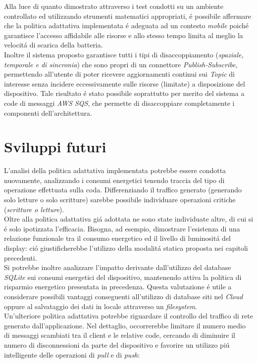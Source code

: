 \documentclass{article}
\begin{document}
Alla luce di quanto dimostrato attraverso i test condotti su un ambiente controllato ed utilizzando strumenti matematici appropriati, \'e possibile affermare che la politica adattativa implementata \'e adeguata ad un contesto \textit{mobile} poich\'e garantisce l'accesso affidabile alle risorse e allo stesso tempo limita al meglio la velocit\'a di scarica della batteria. 
\\
Inoltre il sistema proposto garantisce tutti i tipi di disaccoppiamento (\textit{spaziale, temporale e di sincronia}) che sono propri di un connettore \textit{Publish-Subscribe}, permettendo all'utente di poter ricevere aggiornamenti continui sui \textit{Topic} di interesse senza incidere eccessivamente sulle risorse (limitate) a disposizione del dispositivo. Tale risultato \'e stato possibile soprattutto per merito del sistema a code di messaggi \textit{AWS SQS}, che permette di disaccoppiare completamente i componenti dell'architettura. 

\section{Sviluppi futuri}

L'analisi della politica adattativa implementata potrebbe essere condotta nuovamente, analizzando i consumi energetici tenendo traccia del tipo di operazione effettuata sulla coda. Differenziando il traffico generato (generando solo letture o solo scritture) sarebbe possibile individuare operazioni critiche (\textit{scritture o letture}).
\\
Oltre alla politica adattativa gi\'a adottata ne sono state individuate altre, di cui si \'e solo ipotizzata l'efficacia. Bisogna, ad esempio, dimostrare l'esistenza di una relazione funzionale tra il consumo energetico ed il livello di luminosit\'a del display: ci\'o giustificherebbe l'utilizzo della modalit\'a statica proposta nei capitoli precedenti.
\\
Si potrebbe inoltre analizzare l'impatto derivante dall'utilizzo del database \textit{SQLite} sui consumi energetici del dispositivo, mantenendo attiva la politica di risparmio energetico presentata in precedenza. Questa valutazione \'e utile a considerare possibili vantaggi conseguenti all'utilizzo di database siti nel \textit{Cloud} oppure al salvataggio dei dati in locale attraverso un \textit{filesystem}.
\\
Un'ulteriore politica adattativa potrebbe riguardare il controllo del traffico di rete generato dall'applicazione. Nel dettaglio, occorrerebbe limitare il numero medio di messaggi scambiati tra il client e le relative code, cercando di diminuire il numero di disconnessioni da parte del dispositivo e favorire un utilizzo pi\'u intelligente delle operazioni di \textit{pull} e di \textit{push}:
\end{document}
